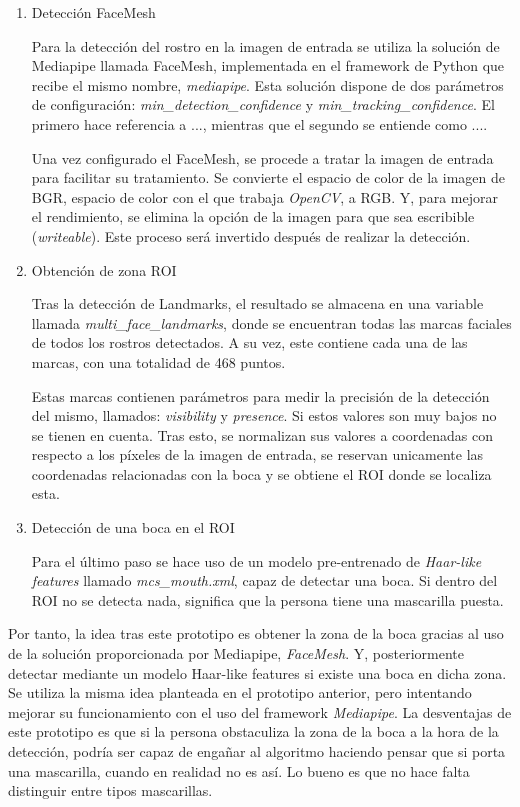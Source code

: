 \begin{enumerate}
	\item Detección FaceMesh
	
	Para la detección del rostro en la imagen de entrada se utiliza la solución de Mediapipe llamada FaceMesh, implementada en el framework de Python que recibe el mismo nombre, \textit{mediapipe}. Esta solución dispone de dos parámetros de configuración: \textit{min\_detection\_confidence} y \textit{min\_tracking\_confidence}. El primero hace referencia a ..., mientras que el segundo se entiende como ....
	
	Una vez configurado el FaceMesh, se procede a tratar la imagen de entrada para facilitar su tratamiento. Se convierte el espacio de color de la imagen de BGR, espacio de color con el que trabaja \textit{OpenCV}, a RGB. Y, para mejorar el rendimiento, se elimina la opción de la imagen para que sea escribible (\textit{writeable}). Este proceso será invertido después de realizar la detección.
	
	\item Obtención de zona ROI
	
	Tras la detección de Landmarks, el resultado se almacena en una variable llamada \textit{multi\_face\_landmarks}, donde se encuentran todas las marcas faciales de todos los rostros detectados. A su vez, este contiene cada una de las marcas, con una totalidad de 468 puntos.

	Estas marcas contienen parámetros para medir la precisión de la detección del mismo, llamados: \textit{visibility} y \textit{presence}. Si estos valores son muy bajos no se tienen en cuenta. Tras esto, se normalizan sus valores a coordenadas con respecto a los píxeles de la imagen de entrada, se reservan unicamente las coordenadas relacionadas con la boca y se obtiene el ROI donde se localiza esta.
	
	\item Detección de una boca en el ROI 
	
	Para el último paso se hace uso de un modelo pre-entrenado de \textit{Haar-like features} llamado \textit{mcs\_mouth.xml}, capaz de detectar una boca. Si dentro del ROI no se detecta nada, significa que la persona tiene una mascarilla puesta.
\end{enumerate}

Por tanto, la idea tras este prototipo es obtener la zona de la boca gracias al uso de la solución proporcionada por Mediapipe, \textit{FaceMesh}. Y, posteriormente detectar mediante un modelo Haar-like features si existe una boca en dicha zona. Se utiliza la misma idea planteada en el prototipo anterior, pero intentando mejorar su funcionamiento con el uso del framework \textit{Mediapipe}. La desventajas de este prototipo es que si la persona obstaculiza la zona de la boca a la hora de la detección, podría ser capaz de engañar al algoritmo haciendo pensar que si porta una mascarilla, cuando en realidad no es así. Lo bueno es que no hace falta distinguir entre tipos mascarillas.

